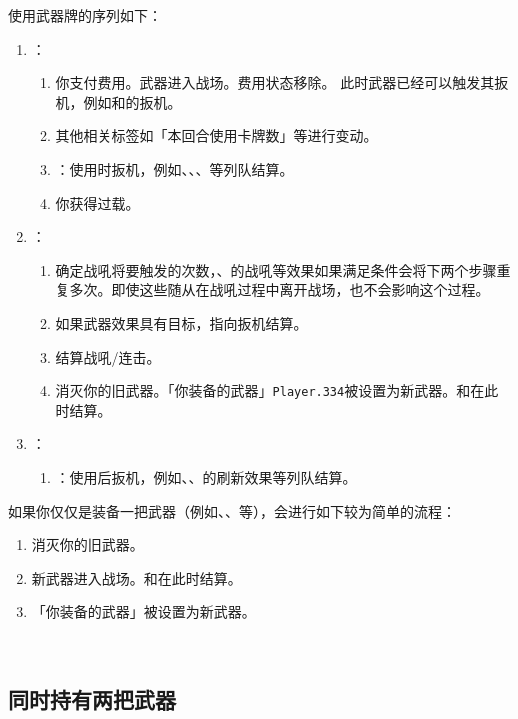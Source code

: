 使用武器牌的序列如下：
\begin{enumerate}
    \item {}：
    \begin{enumerate}
        \item 你支付费用。武器进入战场。费用状态移除。
            \notice 此时武器已经可以触发其扳机，例如和的扳机。
        \item 其他相关标签如「本回合使用卡牌数」等进行变动。
        \item {}：使用时扳机，例如、、、等列队结算。
        \item 你获得过载。
    \end{enumerate}

    \item {}：
    \begin{enumerate}
        \item 确定战吼将要触发的次数，、的战吼等效果如果满足条件会将下两个步骤重复多次。即使这些随从在战吼过程中离开战场，也不会影响这个过程。
        \item 如果武器效果具有目标，指向扳机结算。
        \item 结算战吼/连击。
        \item 消灭你的旧武器。「你装备的武器」\texttt{Player.334}被设置为新武器。和在此时结算。
    \end{enumerate}

    \item {}：
    \begin{enumerate}
        \item {}：使用后扳机，例如、、的刷新效果等列队结算。
    \end{enumerate}
\end{enumerate}
​
如果你仅仅是装备一把武器（例如、、等），会进行如下较为简单的流程：
\begin{enumerate}
    \item 消灭你的旧武器。
    \item 新武器进入战场。和在此时结算。
    \item 「你装备的武器」被设置为新武器。
\end{enumerate}
​
\subsection{同时持有两把武器}

